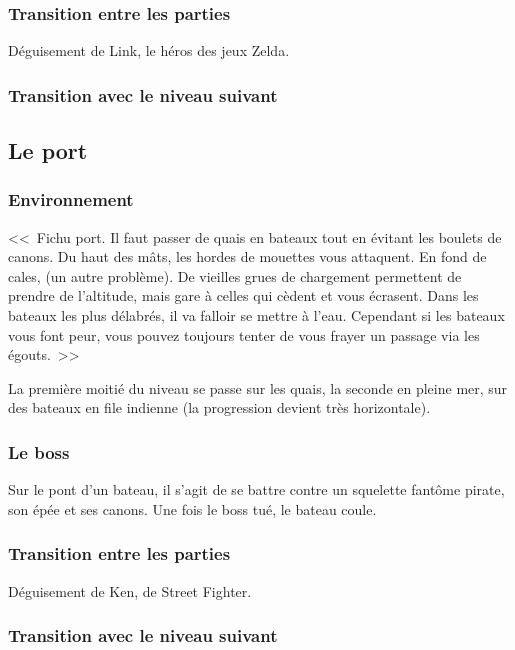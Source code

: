 \documentclass{article}
\begin{document}
\subsubsection{Transition entre les parties}
Déguisement de Link, le héros des jeux Zelda.

\subsubsection{Transition avec le niveau suivant}

\subsection{Le port}
\subsubsection{Environnement}
<<~Fichu port. Il faut passer de quais en bateaux tout en évitant les
boulets de canons. Du haut des mâts, les hordes de mouettes vous
attaquent. En fond de cales,  (un autre problème). De vieilles grues
de chargement permettent de prendre de l'altitude, mais gare à celles
qui cèdent et vous écrasent. Dans les bateaux les plus délabrés, il va
falloir se mettre à l'eau. Cependant si les bateaux vous font peur,
vous pouvez toujours tenter de vous frayer un passage via les
égouts.~>>

La première moitié du niveau se passe sur les quais, la seconde en
pleine mer, sur des bateaux en file indienne (la progression devient
très horizontale).

\subsubsection{Le boss}
Sur le pont d'un bateau, il s'agit de se battre contre un squelette
fantôme pirate, son épée et ses canons. Une fois le boss tué, le
bateau coule.

\subsubsection{Transition entre les parties}
Déguisement de Ken, de Street Fighter.

\subsubsection{Transition avec le niveau suivant}
\end{document}
